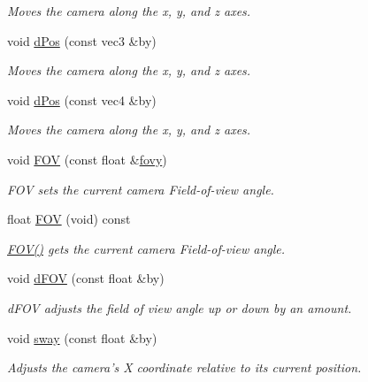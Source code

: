\begin{DoxyCompactItemize}
\begin{DoxyCompactList}\small\item\em \-Moves the camera along the x, y, and z axes. \end{DoxyCompactList}\item 
void \hyperlink{class_camera_a928de59670f0b31264307a8a0888b99d}{d\-Pos} (const vec3 \&by)
\begin{DoxyCompactList}\small\item\em \-Moves the camera along the x, y, and z axes. \end{DoxyCompactList}\item 
void \hyperlink{class_camera_a4ec2e3d2a66826aedb1ac1eee7da0b96}{d\-Pos} (const vec4 \&by)
\begin{DoxyCompactList}\small\item\em \-Moves the camera along the x, y, and z axes. \end{DoxyCompactList}\item 
void \hyperlink{class_camera_ac325bf616014d2e6023b84b6224630ac}{\-F\-O\-V} (const float \&\hyperlink{class_camera_acc8b97facc57059530efad534c2f8314}{fovy})
\begin{DoxyCompactList}\small\item\em \-F\-O\-V sets the current camera \-Field-\/of-\/view angle. \end{DoxyCompactList}\item 
float \hyperlink{class_camera_a8817ea073431268d8c0e522cdc30026c}{\-F\-O\-V} (void) const 
\begin{DoxyCompactList}\small\item\em \hyperlink{class_camera_a8817ea073431268d8c0e522cdc30026c}{\-F\-O\-V()} gets the current camera \-Field-\/of-\/view angle. \end{DoxyCompactList}\item 
void \hyperlink{class_camera_a55355b3376d195b17adcc6a5b72ae07b}{d\-F\-O\-V} (const float \&by)
\begin{DoxyCompactList}\small\item\em d\-F\-O\-V adjusts the field of view angle up or down by an amount. \end{DoxyCompactList}\item 
void \hyperlink{class_camera_abbe6fe82ed05e64e35b0c4ed2001b34e}{sway} (const float \&by)
\begin{DoxyCompactList}\small\item\em \-Adjusts the camera's \-X coordinate relative to its current position. \end{DoxyCompactList}\item 

\end{DoxyCompactItemize}
